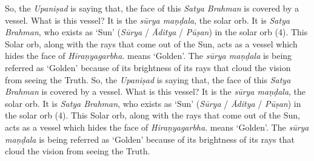 So, the \emph{Upaniṣad} is saying that, the face of this \emph{Satya Brahman} is covered by a vessel. What is this vessel? It is the \emph{sūrya maṇḍala}, the solar orb. It is \emph{Satya Brahman}, who exists as `Sun' (\emph{Sūrya} / \emph{Āditya} / \emph{Pūṣan}) in the solar orb (4). This Solar orb, along with the rays that come out of the Sun, acts as a vessel which hides the face of \emph{Hiraṇyagarbha}.  means `Golden'. The \emph{sūrya maṇḍala} is being referred as `Golden' because of its brightness of its rays that cloud the vision from seeing the Truth.
So, the \emph{Upaniṣad} is saying that, the face of this \emph{Satya Brahman} is covered by a vessel. What is this vessel? It is the \emph{sūrya maṇḍala}, the solar orb. It is \emph{Satya Brahman}, who exists as `Sun' (\emph{Sūrya} / \emph{Āditya} / \emph{Pūṣan}) in the solar orb (4). This Solar orb, along with the rays that come out of the Sun, acts as a vessel which hides the face of \emph{Hiraṇyagarbha}.  means `Golden'. The \emph{sūrya maṇḍala} is being referred as `Golden' because of its brightness of its rays that cloud the vision from seeing the Truth.


